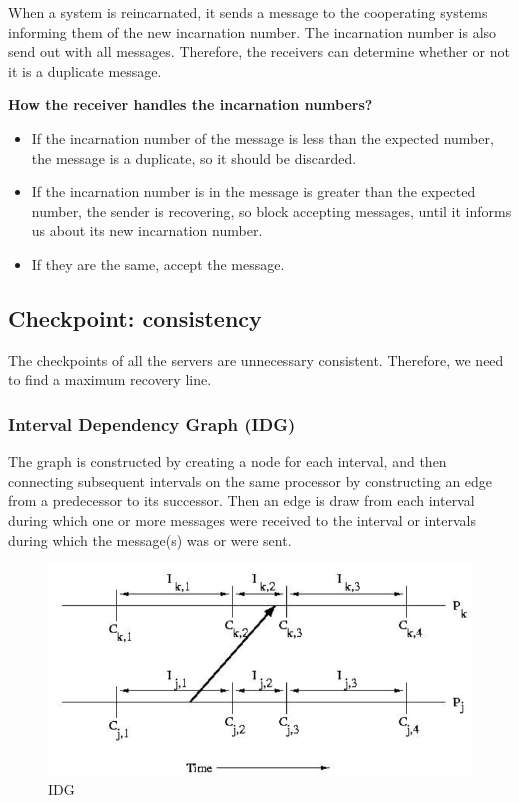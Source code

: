 When a system is reincarnated, it sends a message to the cooperating systems informing them of the new incarnation number. The incarnation number is also send out with all messages. Therefore, the receivers can determine whether or not it is a duplicate message.

\textbf{How the receiver handles the incarnation numbers?}
\begin{itemize}
    \item If the incarnation number of the message is less than the expected number, the message is a duplicate, so it should be discarded.
    \item If the incarnation number is in the message is greater than the expected number, the sender is recovering, so block accepting messages, until it informs us about its new incarnation number.
    \item If they are the same, accept the message.
\end{itemize}

\subsection{Checkpoint: consistency}
The checkpoints of all the servers are unnecessary consistent. Therefore, we need to find a maximum recovery line.

\subsubsection{Interval Dependency Graph (IDG)}
The graph is constructed by creating a node for each interval, and then connecting subsequent intervals on the same processor by constructing an edge from a predecessor to its successor. Then an edge is draw from each interval during which one or more messages were received to the interval or intervals during which the message(s) was or were sent.
\begin{figure}
\centering
\includegraphics[width=\textwidth]{img/ch03-idg.png}
\caption{IDG}
\label{fig:ch03-idg}
\end{figure}

